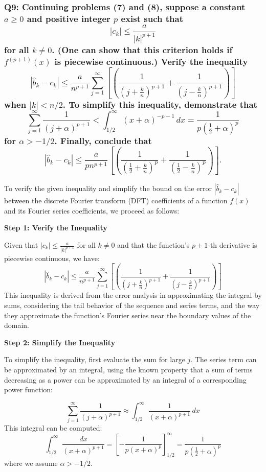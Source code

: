 \documentclass[8pt]{article}
\begin{document}
\subsubsection*{Q9:
Continuing problems (7) and (8), suppose a constant \(a \geq 0\) and positive integer \(p\) exist such that
\[
|c_k| \leq \frac{a}{|k|^{p+1}}
\]
for all \(k \neq 0\). (One can show that this criterion holds if \(f^{(p+1)}(x)\) is piecewise continuous.) Verify the inequality
\[
|\hat{b}_k - c_k| \leq \frac{a}{n^{p+1}} \sum_{j=1}^\infty \left[ \left( \frac{1}{\left( j + \frac{k}{n} \right)^{p+1}} + \frac{1}{\left( j - \frac{k}{n} \right)^{p+1}} \right) \right]
\]
when \(|k| < n/2\). To simplify this inequality, demonstrate that
\[
\sum_{j=1}^\infty \frac{1}{(j + \alpha)^{p+1}} < \int_{1/2}^\infty (x + \alpha)^{-p-1} \, dx = \frac{1}{p \left( \frac{1}{2} + \alpha \right)^p}
\]
for \(\alpha > -1/2\). Finally, conclude that
\[
|\hat{b}_k - c_k| \leq \frac{a}{pn^{p+1}} \left[ \left( \frac{1}{\left( \frac{1}{2} + \frac{k}{n} \right)^p} + \frac{1}{\left( \frac{1}{2} - \frac{k}{n} \right)^p} \right) \right].
\]}

To verify the given inequality and simplify the bound on the error \(|\hat{b}_k - c_k|\) between the discrete Fourier transform (DFT) coefficients of a function \(f(x)\) and its Fourier series coefficients, we proceed as follows:

\textbf{Step 1: Verify the Inequality}

Given that \(|c_k| \leq \frac{a}{|k|^{p+1}}\) for all \(k \neq 0\) and that the function's \(p+1\)-th derivative is piecewise continuous, we have:
\[ |\hat{b}_k - c_k| \leq \frac{a}{n^{p+1}} \sum_{j=1}^\infty \left[ \left( \frac{1}{\left( j + \frac{k}{n} \right)^{p+1}} + \frac{1}{\left( j - \frac{k}{n} \right)^{p+1}} \right) \right] \]
This inequality is derived from the error analysis in approximating the integral by sums, considering the tail behavior of the sequence and series terms, and the way they approximate the function's Fourier series near the boundary values of the domain.

\textbf{Step 2: Simplify the Inequality}

To simplify the inequality, first evaluate the sum for large \(j\). The series term can be approximated by an integral, using the known property that a sum of terms decreasing as a power can be approximated by an integral of a corresponding power function:

\[ \sum_{j=1}^\infty \frac{1}{(j + \alpha)^{p+1}} \approx \int_{1/2}^\infty \frac{1}{(x + \alpha)^{p+1}} \, dx \]
This integral can be computed:
\[ \int_{1/2}^\infty \frac{dx}{(x + \alpha)^{p+1}} = \left[ -\frac{1}{p(x + \alpha)^p} \right]_{1/2}^\infty = \frac{1}{p \left(\frac{1}{2} + \alpha\right)^p} \]
where we assume \( \alpha > -1/2 \).
\end{document}
